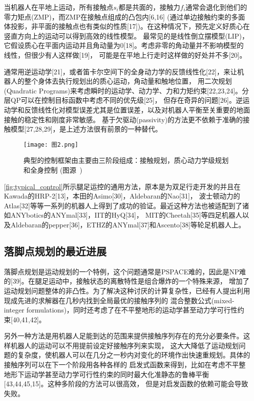 当机器人在平地上运动，所有接触点$s_i$都是共面的，接触力$f_i$通常会退化到他们的零力矩点(ZMP)，而ZMP在接触点组成的凸包内[6,16]
(通过单边接触约束的多面体投影，非平面的接触点也有类似的性质[17])。在这种情况下，预先定义好质心在竖直方向上的运动可以得到高效的线性模型。
最常见的是线性倒立摆模型(LIP)，它假设质心在平面内运动并且角动量为0[18]。考虑非零的角动量并不影响模型的线性，但很少有人这样做[19]，
可能是在平地上行走时这样做的好处并不多[20]。

通常用逆运动学[21]，或者笛卡尔空间下的全身动力学的反馈线性化[22]，来让机器人的整个身体去执行规划出的质心运动，角动量和触地位置，
用二次规划(Quadratic Programs)来考虑瞬时的运动学、动力学、力和力矩约束[22,23,24]。分层QP可以在控制目标函数中考虑不同的优先级[25]，
但存在奇异的问题[26]。逆运动学和反馈线性化对模型误差尤其是位置误差，以及对机器人平衡至关重要的地面接触的稳定性和刚度非常敏感。
基于欠驱动(passivity)的方法更不依赖于准确的接触模型[27,28,29]，是上述方法很有前景的一种替代。
\begin{figure}[htbp]
    \centering
    \texttt{[image: 图2.png]}
    \caption{\label{fig:typical_control}典型的控制框架由主要由三阶段组成：接触规划，质心动力学级规划和全身控制
                (图源~\cite{carpentier2016center})}
\end{figure}
\autoref{fig:typical_control}所示腿足运控的通用方法，原本是为双足行走开发的并且在Kawada的HRP-2[13]，本田的Asimo[30]，Aldebaran的Nao[31]，
波士顿动力的Atlas[32]等等一系列的机器人上得到了成功的验证。最近这种方法也被适配到了诸如ANYbotics的ANYmal[33]，IIT的HyQ[34]，
MIT的Cheetah[35]等四足机器人以及Aldebaran的pepper[36]，ETHZ的ANYmal[37]和Ascento[38]等轮足机器人上。

\subsection{落脚点规划的最近进展}
落脚点规划是运动规划的一个特例，这个问题通常是PSPACE难的，因此是NP难的[39]。在腿足运动中，接触状态的离散特性是组合爆炸的一个特殊来源，
增加了运动规划问题整体的非凸性。为了解决这种讨厌的计算复杂性，已经有人提出利用现成先进的求解器在几秒内找到全局最优的接触序列的
混合整数公式(mixed-integer formulations)，同时还考虑了在不平整地形的运动学甚至动力学可行性约束[40,41,42]。

另外一种方法是用机器人足能到达的范围来提供接触序列存在的充分必要条件。这样机器人的运动可以不用提前设定好接触序列来实现，
这大大降低了运动规划问题的复杂度，使机器人可以在几分之一秒内对变化的环境作出快速重规划。具体的接触序列可以在下一个阶段用各种各样的
启发式函数来得到，比如在考虑不平整地形下运动学甚至动力学可行性约束的同时最大化准静态的鲁棒平衡[43,44,45,15]。这种多阶段的方法可以很高效，
但是对启发函数的依赖可能会导致失败。

